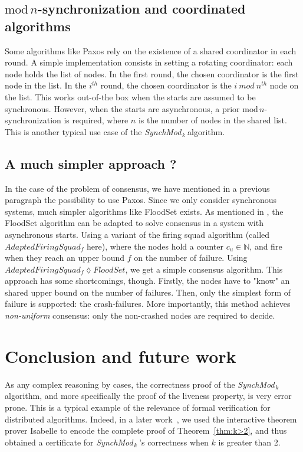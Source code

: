 \documentclass[11pt,letterpaper]{article}
\newcommand{\SM}{{\em SynchMod}$_{\,k}\ $}
\begin{document}
\subsection{$\mathrm{mod}\,n$-synchronization and coordinated algorithms}

Some algorithms like Paxos rely on the existence of a shared coordinator in each round.
A simple implementation consists in setting a rotating coordinator: 
each node holds the list of nodes. In the first round, the chosen coordinator is the first node in the list.
In the $i^{th}$ round, the chosen coordinator is the $i~mod~n^{th}$ node on the list.
This works out-of-the box when the starts are assumed to be synchronous.
However, when the starts are asynchronous, a prior $\mathrm{mod}\,n$-synchronization is required, where $n$ is the number of nodes in the shared list.
This is another typical use case of the \SM algorithm.

\subsection{A much simpler approach ?}

In the case of the problem of consensus, we have mentioned in a previous paragraph the possibility to use Paxos.
Since we only consider synchronous systems, much simpler algorithms like FloodSet \cite{Lyn96} exists.
As mentioned in \cite{CDDS85}, the FloodSet algorithm can be adapted to solve consensus in a system with asynchronous starts.
Using a variant of the firing squad algorithm (called $AdaptedFiringSquad_f$ here),
where the nodes hold a counter $c_u \in \mathds{N}$, and fire when they reach an upper bound $f$ on the number of failure.
Using $AdaptedFiringSquad_f \lozenge FloodSet$, we get a simple consensus algorithm.
This approach has some shortcomings, though.
Firstly, the nodes have to "know" an shared upper bound on the number of failures.
Then, only the simplest form of failure is supported: the crash-failures.
More importantly, this method achieves \textit{non-uniform} consensus: only the non-crashed nodes are required to decide.

\section{Conclusion and future work}

As any complex reasoning by cases, the correctness proof  of the \SM   algorithm, 
	and more specifically the proof of the liveness property, is very error prone. 
This is a typical example of the relevance of formal verification for distributed algorithms. 
Indeed, in a later work~\cite{}, we used the interactive theorem prover Isabelle \cite{Merz12} to encode the complete proof 
	of Theorem~\ref{thm:k>2}, and thus obtained a certificate for  \SM\!\!'s correctness when $k$ is greater than 2.
	
\end{document}

